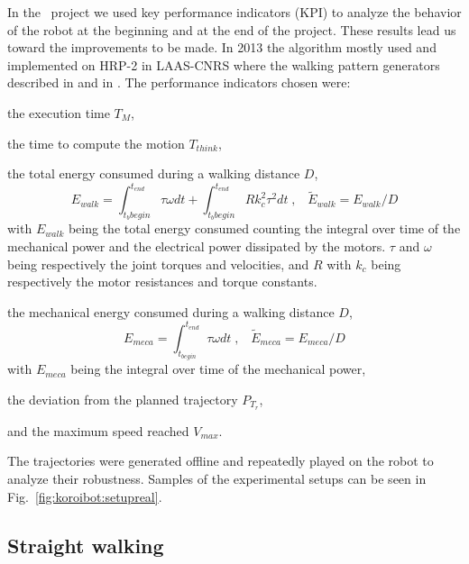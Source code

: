 In the \koroibot\ project we used key performance indicators (KPI) to analyze the behavior of the robot at the beginning and at the end of the project.
These results lead us toward the improvements to be made.
In 2013 the algorithm mostly used and implemented on HRP-2 in LAAS-CNRS where the walking pattern generators described in \cite{Morisawa:ICRA:2007} and in \cite{herdt:iros:2010}.
The performance indicators chosen were:
\begin{list}{ .}{%
		\setlength{\topsep}{5pt}%
		\setlength{\itemsep}{0pt}%
		\setlength{\parsep}{0pt}%
		\setlength{\labelwidth}{3.em}%
		\setlength{\leftmargin}{2em}%
		\setlength{\labelsep}{0.5em}%
	}

\item[\bluesquare] the execution time $T_M$,
\item[\bluesquare] the time to compute the motion $T_{think}$,
\item[\bluesquare] the total energy consumed during a walking distance $D$,
\begin{equation*}
E_{walk} = \int_{t_b{begin}}^{t_{end}} \tau \omega dt + \int_{t_b{begin}}^{t_{end}} R k_c^2
\tau^2 dt \;,\;\;\; \tilde{E}_{walk} = E_{walk}/D 
\end{equation*}
with $E_{walk}$ being the total energy consumed counting the integral over time of the mechanical power and the electrical power dissipated by the motors. $\tau$ and $\omega$ being respectively the joint torques and velocities, and $R$ with $k_c$ being respectively the motor resistances and torque constants.
\item[\bluesquare] the mechanical energy consumed during a walking distance $D$,
\begin{equation*}
E_{meca} = \int_{t_{begin}}^{t_{end}} \tau \omega dt
 \;,\;\;\; \tilde{E}_{meca} = E_{meca}/D 
\end{equation*}
with $E_{meca}$ being the integral over time of the mechanical power,
\item[\bluesquare] the deviation from the planned trajectory $P_{T_r}$,
\item[\bluesquare] and the maximum speed reached $V_{max}$.
\end{list}
The trajectories were generated offline and repeatedly played on the robot to analyze their robustness.
Samples of the experimental setups can be seen in Fig.~\ref{fig:koroibot:setupreal}.

\subsection*{Straight walking}

